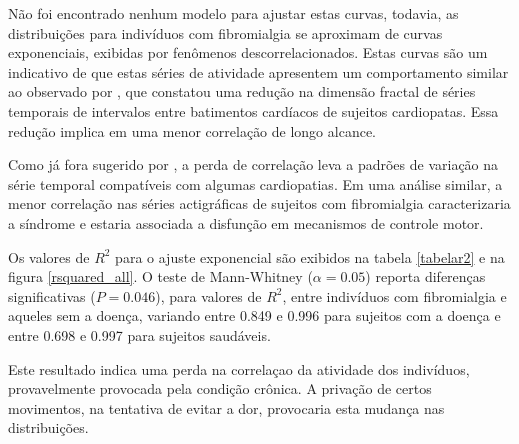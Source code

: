 \documentclass{ufscThesis}
\begin{document}
Não foi encontrado nenhum modelo para ajustar estas curvas, todavia, as distribuições para indivíduos com fibromialgia se aproximam de curvas exponenciais, exibidas por fenômenos descorrelacionados. Estas curvas são um indicativo de que estas séries de atividade apresentem um comportamento similar ao observado por , que constatou uma redução na dimensão fractal de séries temporais de intervalos entre batimentos cardíacos de sujeitos cardiopatas. Essa redução implica em uma menor correlação de longo alcance.\par
Como já fora sugerido por \cite{Peng1993}, a perda de correlação leva a padrões de variação na série temporal compatíveis com algumas cardiopatias. Em uma análise similar, a menor correlação nas séries actigráficas de sujeitos com fibromialgia caracterizaria a síndrome e estaria associada a disfunção em mecanismos de controle motor. \par
Os valores de $R^2$ para o ajuste exponencial são exibidos na tabela \ref{tabelar2} e na figura \ref{rsquared_all}. O teste de Mann-Whitney ($\alpha=0.05$) reporta diferenças significativas ($P=0.046$), para valores de $R^2$, entre indivíduos com fibromialgia e aqueles sem a doença, variando entre 0.849 e 0.996 para sujeitos com a doença e entre 0.698 e 0.997 para sujeitos saudáveis. \par
Este resultado indica uma perda na correlaçao da atividade dos indivíduos, provavelmente provocada pela condição crônica. A privação de certos movimentos, na tentativa de evitar a dor, provocaria esta mudança nas distribuições. 
\end{document}
